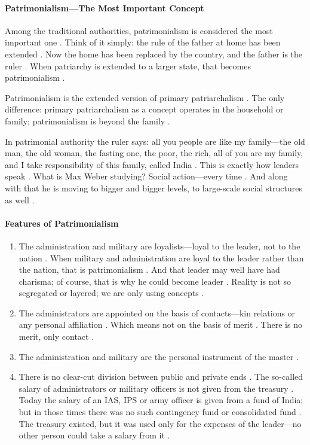 \paragraph{Patrimonialism---The Most Important Concept}
Among the traditional authorities, patrimonialism is considered the most important one . Think of it simply: the rule of the father at home has been extended . Now the home has been replaced by the country, and the father is the ruler . When patriarchy is extended to a larger state, that becomes patrimonialism .

\begin{KeyConcept}
Patrimonialism is the extended version of primary patriarchalism .
The only difference: primary patriarchalism as a concept operates in the household or family; patrimonialism is beyond the family .
\end{KeyConcept}

In patrimonial authority the ruler says: all you people are like my family---the old man, the old woman, the fasting one, the poor, the rich, all of you are my family, and I take responsibility of this family, called India . This is exactly how leaders speak .
What is Max Weber studying? Social action---every time . And along with that he is moving to bigger and bigger levels, to large-scale social structures as well .

\paragraph{Features of Patrimonialism}
\begin{enumerate}
    \item The administration and military are loyalists---loyal to the leader, not to the nation . When military and administration are loyal to the leader rather than the nation, that is patrimonialism . And that leader may well have had charisma; of course, that is why he could become leader . Reality is not so segregated or layered; we are only using concepts .
    \item The administrators are appointed on the basis of contacts---kin relations or any personal affiliation . Which means not on the basis of merit . There is no merit, only contact .
    \item The administration and military are the personal instrument of the master .
    \item There is no clear-cut division between public and private ends . The so-called salary of administrators or military officers is not given from the treasury . Today the salary of an IAS, IPS or army officer is given from a fund of India; but in those times there was no such contingency fund or consolidated fund . The treasury existed, but it was used only for the expenses of the leader---no other person could take a salary from it .
\end{enumerate}

